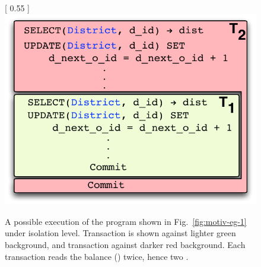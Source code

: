 \begin{figure}[!h]
\centering
{} [
  0.55\columnwidth
] {
  \includegraphics[scale=0.6]{Figures/motiv-eg-1-a}
}
\caption{\small A possible execution of the program shown in Fig.~\ref{fig:motiv-eg-1} under
   isolation level. Transaction  is shown
  against lighter green background, and transaction  against
  darker red background. Each transaction reads the balance ()
  twice, hence two .}
\label{fig:rc-ex}
\end{figure}

